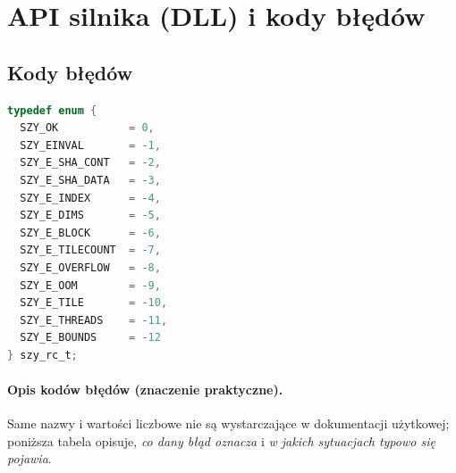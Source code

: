 \documentclass[11pt,a4paper]{article}
\begin{document}
\section{API silnika (DLL) i kody błędów}

\subsection{Kody błędów}
\begin{lstlisting}[style=cstyle,language=C,caption={Kody błędów (szy\_rc.h)}]
typedef enum {
  SZY_OK           = 0,
  SZY_EINVAL       = -1,
  SZY_E_SHA_CONT   = -2,
  SZY_E_SHA_DATA   = -3,
  SZY_E_INDEX      = -4,
  SZY_E_DIMS       = -5,
  SZY_E_BLOCK      = -6,
  SZY_E_TILECOUNT  = -7,
  SZY_E_OVERFLOW   = -8,
  SZY_E_OOM        = -9,
  SZY_E_TILE       = -10,
  SZY_E_THREADS    = -11,
  SZY_E_BOUNDS     = -12
} szy_rc_t;
\end{lstlisting}

\paragraph{Opis kodów błędów (znaczenie praktyczne).}
Same nazwy i wartości liczbowe nie są wystarczające w dokumentacji użytkowej; poniższa tabela opisuje, \emph{co dany błąd oznacza} i \emph{w jakich sytuacjach typowo się pojawia}.
\end{document}
